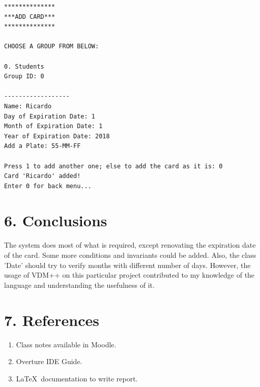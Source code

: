 \documentclass[12pt]{report}
\begin{document}
\begin{lstlisting}[style=DOS]
**************
***ADD CARD***
**************

CHOOSE A GROUP FROM BELOW:

0. Students
Group ID: 0

------------------
Name: Ricardo
Day of Expiration Date: 1
Month of Expiration Date: 1
Year of Expiration Date: 2018
Add a Plate: 55-MM-FF

Press 1 to add another one; else to add the card as it is: 0
Card 'Ricardo' added!
Enter 0 for back menu...
\end{lstlisting}

\newpage
\section*{6. Conclusions}
The system does most of what is required, except renovating the expiration date of the card. Some more conditions and invariants could be added. Also, the class 'Date' should try to verify months with different number of days. However, the usage of VDM++ on this particular project contributed to my knowledge of the language and understanding the usefulness of it.

\newpage

\section*{7. References}
\begin{enumerate}
\item Class notes available in Moodle.
\item Overture IDE Guide.
\item \LaTeX\  documentation to write report.
\end{enumerate}
\end{document}
